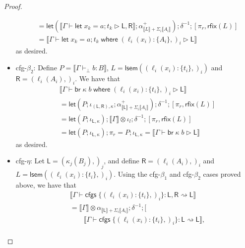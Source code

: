 \documentclass[acmsmall,screen,review]{acmart}
\newcommand{\ms}[1]{\ensuremath{\mathsf{#1}}}
\newcommand{\lto}{:}
\newcommand{\letstmt}[3]{\ensuremath{\ms{let}\;#1 = #2; #3}}
\newcommand{\brb}[2]{\ms{br}\;#1\;#2}
\newcommand{\where}[2]{#1\;\ms{where}\;#2}
\newcommand{\wbranch}[3]{#1(#2) \lto \{#3\}}
\newcommand{\cfgsubst}[1]{\ms{cfgs}\;\{#1\}}
\newcommand{\hasty}[4]{#1 \vdash_{#2} #3: {#4}}
\newcommand{\haslb}[3]{#1 \vdash #2 \rhd #3}
\newcommand{\lbsubst}[4]{#1 \vdash #2: #3 \rightsquigarrow #4}
\newcommand{\brle}[1]{{\textsf{#1}}}
\newcommand{\dnt}[1]{\llbracket{#1}\rrbracket}
\newcommand{\loopmor}[1]{\ms{lsem}(#1)}
\newcommand{\lmor}[1]{\ms{let}(#1)}
\newcommand{\rfix}[1]{\ms{rfix}(#1)}
\begin{document}
\begin{proof}
\begin{itemize}[leftmargin=*]
\begin{equation}
\begin{aligned}
        & = \lmor{
            \dnt{\haslb{\Gamma}{\letstmt{x_k}{a}{t_k}}{\ms{L}, \ms{R}}} 
            ; \alpha^+_{\dnt{L} + \Sigma_i\dnt{A_i}}}
          ; \delta^{-1}
          ; [\pi_r, \rfix{L}] \\
        & = \dnt{
          \haslb{\Gamma}{\where{\letstmt{x_k}{a}{t_k}}{(\wbranch{\ell_i}{x_i}{A_i},)_i}}{\ms{L}}
        }
      \end{aligned}
    \end{equation}
    as desired.
    \item \brle{cfg-$\beta_2$}: 
    Define $P = \dnt{\hasty{\Gamma}{\bot}{b}{B}}$,
            $L = \loopmor{(\wbranch{\ell_i}{x_i}{t_i},)_i}$ and %
            $\ms{R} = (\ell_i(A_i),)_i$. %
    We have that
    \begin{equation}
      \begin{aligned}
        & \dnt{\haslb{\Gamma}{\where{\brb{\kappa}{b}}{(\wbranch{\ell_i}{x_i}{t_i},)_i}}{\ms{L}}} \\
        & = \lmor{P 
            ; \iota_{(\ms{L}, \ms{R}), \kappa} 
            ; \alpha^+_{\dnt{\ms{L}} + \Sigma_i \dnt{A_i}}
          } ; \delta^{-1} ; [\pi_r, \rfix{L}] \\
        & = \lmor{P ; \iota_{\ms{L}, \kappa}} 
          ; \dnt{\Gamma} \otimes \iota_l ; \delta^{-1} ; [\pi_r, \rfix{L}] \\
        & = \lmor{P ; \iota_{\ms{L}, \kappa}} ; \pi_r
          = P ; \iota_{\ms{L}, \kappa}
          = \dnt{\haslb{\Gamma}{\brb{\kappa}{b}}{\ms{L}}}
      \end{aligned}
    \end{equation}
    as desired.
    \item \brle{cfg-$\eta$}: 
    Let $\ms{L} = (\kappa_j(B_j),)_j$, and define %
      $\ms{R} = (\ell_i(A_i),)_i$ and %
      $L = \loopmor{(\wbranch{\ell_i}{x_i}{t_i},)_i}$. %
    Using the \brle{cfg-$\beta_1$} and \brle{cfg-$\beta_2$} cases proved above, we have that
    \begin{equation}
      \begin{aligned}
        & \dnt{
            \lbsubst{\Gamma}
              {\cfgsubst{(\wbranch{\ell_i}{x_i}{t_i},)_i}}{\ms{L}, \ms{R}}{\ms{L}}
          } \\
        & = \dnt{\Gamma} \otimes \alpha_{\dnt{\ms{L}} + \Sigma_i\dnt{A_i}} ; \delta^{-1}
          ; [ \\ & \qquad
            \dnt{
              \lbsubst{\Gamma}
                {\cfgsubst{(\wbranch{\ell_i}{x_i}{t_i},)_i}}{\ms{L}}{\ms{L}}
            }, \\ & \qquad

\end{aligned}
\end{equation}
\end{itemize}
\end{proof}
\end{document}
